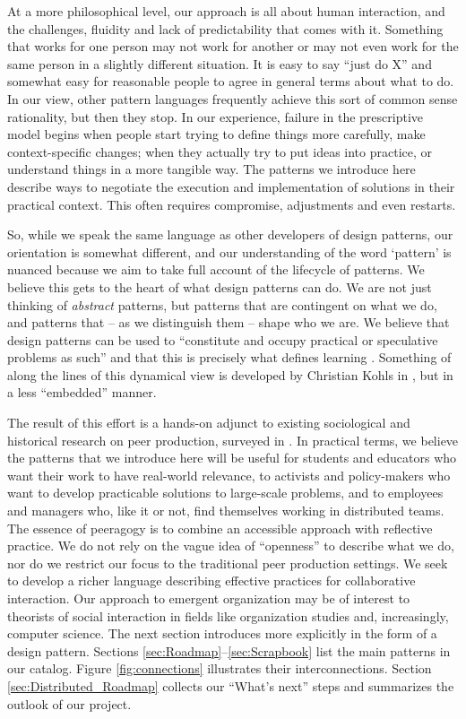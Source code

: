 At a more philosophical level, our approach is all about human interaction, and the challenges, fluidity and lack of predictability that comes with it.  Something that works for one person may not work for another or may not even work for the same person in a slightly different situation.  It is easy to say ``just do X'' and somewhat easy for reasonable people to agree in general terms about what to do.  In our view, other pattern languages frequently achieve this sort of common sense rationality, but then they stop.  In our experience, failure in the prescriptive model begins when people start trying to define things more carefully, make context-specific changes; when they actually try to put ideas into practice, or understand things in a more tangible way. The patterns we introduce here describe ways to negotiate the execution and implementation of solutions in their practical context.  This often requires compromise, adjustments and even restarts.  

So, while we speak the same language as other developers of design patterns, our orientation is somewhat different, and our understanding of the word `pattern' is nuanced because we aim to take full account of the lifecycle of patterns.  We believe this gets to the heart of what design patterns can do.  We are not just thinking of \emph{abstract} patterns, but patterns that are contingent on what we do, and patterns that -- as we distinguish them -- shape who we are.   We believe that design patterns can be used to ``constitute and occupy practical or speculative problems as such'' and that this is precisely what defines learning \cite[p. 204]{deleuze1994difference}.   Something of along the lines of this dynamical view
is developed by Christian Kohls in \cite{kohls2010structure,kohls2011structure}, but in a less ``embedded'' manner.

The result of this effort is a hands-on adjunct to existing sociological and historical research on peer production, surveyed in \cite{benkler2015peer}.  In practical terms, we believe the patterns that we introduce here will be useful for students and educators who want their work to have real-world relevance, to activists and policy-makers who want to develop practicable solutions to large-scale problems, and to employees and managers who, like it or not, find themselves working in distributed teams. 
The essence of peeragogy is to combine an accessible approach with reflective practice.  We do not rely on the vague idea of ``openness'' to describe what we do, nor do we restrict our focus to the traditional peer production settings.  We seek to develop a richer language describing effective practices for collaborative interaction.  Our approach to emergent organization may be of interest to theorists of social interaction in fields like organization studies and, increasingly, computer science.  The next section introduces  more explicitly in the form of a design pattern.  Sections \ref{sec:Roadmap}--\ref{sec:Scrapbook} list the main patterns in our catalog.    Figure \ref{fig:connections} illustrates their interconnections.  Section \ref{sec:Distributed_Roadmap} collects our ``What's next'' steps and summarizes the outlook of our project.

